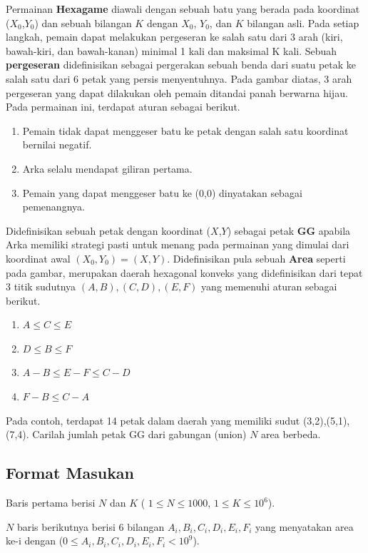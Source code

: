 \documentclass{article}
\begin{document}
Permainan \textbf{Hexagame} diawali dengan sebuah batu yang berada pada koordinat ($X_0$,$Y_0$) dan sebuah bilangan $K$ dengan $X_0$, $Y_0$, dan $K$ bilangan asli. Pada setiap langkah, pemain dapat melakukan pergeseran ke salah satu dari 3 arah (kiri, bawah-kiri, dan bawah-kanan) minimal 1 kali dan maksimal K kali. Sebuah \textbf{pergeseran} didefinisikan sebagai pergerakan sebuah benda dari suatu petak ke salah satu dari 6 petak yang persis menyentuhnya. Pada gambar diatas, 3 arah pergeseran yang dapat dilakukan oleh pemain ditandai panah berwarna hijau. Pada permainan ini, terdapat aturan sebagai berikut.

\begin{enumerate}
  \item Pemain tidak dapat menggeser batu ke petak dengan salah satu koordinat bernilai negatif.
  \item Arka selalu mendapat giliran pertama.
  \item Pemain yang dapat menggeser batu ke (0,0) dinyatakan sebagai pemenangnya.
\end{enumerate}

Didefinisikan sebuah petak dengan koordinat ($X$,$Y$) sebagai petak \textbf{GG} apabila Arka memiliki strategi pasti untuk menang pada permainan yang dimulai dari koordinat awal $(X_0, Y_0) = (X,Y)$. Didefinisikan pula sebuah \textbf{Area} seperti pada gambar, merupakan daerah hexagonal konveks yang didefinisikan dari tepat 3 titik sudutnya $(A,B),(C,D),(E,F)$ yang memenuhi aturan sebagai berikut.
\begin{enumerate}
  \item $A \leq C \leq E$
  \item $D \leq B \leq F$
  \item $A-B \leq E-F \leq C-D$
  \item $F-B \leq C-A$
\end{enumerate} 

Pada contoh, terdapat 14 petak dalam daerah yang memiliki sudut (3,2),(5,1),(7,4). Carilah jumlah petak GG dari gabungan (union) $N$ area berbeda.

\subsection*{Format Masukan}
Baris pertama berisi $N$ dan $K$ ( $1 \leq N \leq 1000$, $1 \leq K \leq 10^6$).

$N$ baris berikutnya berisi 6 bilangan $A_i, B_i, C_i, D_i, E_i, F_i$ yang menyatakan area ke-i dengan ($0 \leq A_i, B_i, C_i, D_i, E_i, F_i < 10^9$).
\end{document}
